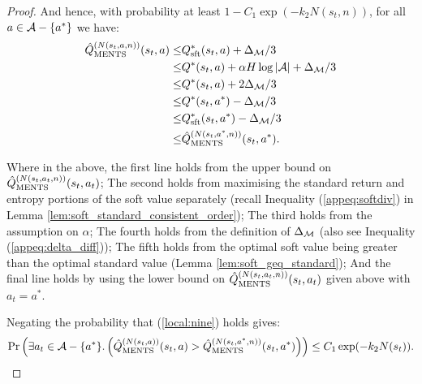 \begin{proof}
            And hence, with probability at least $1-C_1 \exp(-k_2N(s_t,n))$, for all $a\in\mathcal{A}-\{a^*\}$ we have:
            \begin{align}
                {\hat{Q}^{(N(s_t,a,n))}_{{\textnormal{MENTS}}}}(s_t,a)
                    \leq& Q_{{\textnormal{sft}}}^*(s_t,a) + \Delta_{\mathcal{M}}/3 \\
                    \leq& Q^*(s_t,a) + \alpha H\log |\mathcal{A}| + \Delta_{\mathcal{M}}/3 \\
                    \leq& Q^*(s_t,a) + 2\Delta_{\mathcal{M}}/3 \\
                    \leq& Q^*(s_t,a^*) - \Delta_{\mathcal{M}}/3 \\
                    \leq& Q_{{\textnormal{sft}}}^*(s_t,a^*) - \Delta_{\mathcal{M}}/3 \\
                    \leq& {\hat{Q}^{(N(s_t,a^*,n))}_{{\textnormal{MENTS}}}}(s_t,a^*). \label{local:nine}
            \end{align}
            
            Where in the above, the first line holds from the upper bound on ${\hat{Q}^{(N(s_t,a_t,n))}_{{\textnormal{MENTS}}}}(s_t,a_t)$; The second holds from maximising the standard return and entropy portions of the soft value separately (recall Inequality (\ref{appeq:softdiv}) in Lemma \ref{lem:soft_standard_consistent_order}); The third holds from the assumption on $\alpha$; The fourth holds from the definition of $\Delta_{\mathcal{M}}$ (also see Inequality (\ref{appeq:delta_diff})); The fifth holds from the optimal soft value being greater than the optimal standard value (Lemma \ref{lem:soft_geq_standard}); And the final line holds by using the lower bound on ${\hat{Q}^{(N(s_t,a_t,n))}_{{\textnormal{MENTS}}}}(s_t,a_t)$ given above with $a_t=a^*$. 
            
            Negating the probability that (\ref{local:nine}) holds gives:
            \begin{align}
                \Pr\left(\exists a_t\in\mathcal{A}-\{a^*\}.\left( 
                    {\hat{Q}^{(N(s_t,a))}_{{\textnormal{MENTS}}}}(s_t,a) > {\hat{Q}^{(N(s_t,a^*,n))}_{{\textnormal{MENTS}}}}(s_t,a^*)\right)\right)
                    \leq C_1 \exp(-k_2N(s_t)).
            \end{align}
            

\end{proof}

